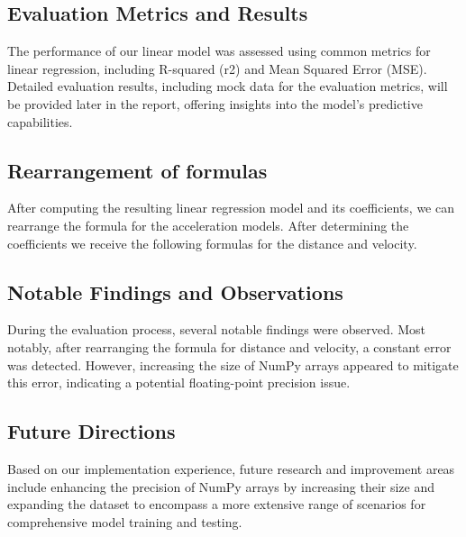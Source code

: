 \subsection{Evaluation Metrics and Results} 
The performance of our linear model was assessed using common metrics for linear regression, including 
R-squared (r2) and Mean Squared Error (MSE). 
Detailed evaluation results, including mock data for the evaluation metrics, will be provided later in the report, 
offering insights into the model's predictive capabilities.

\subsection{Rearrangement of formulas} 
After computing the resulting linear regression model and its coefficients, we can rearrange the formula 
for the acceleration models. 
After determining the coefficients we receive the following formulas for the distance and velocity.


\subsection{Notable Findings and Observations} 
During the evaluation process, several notable findings were observed. 
Most notably, after rearranging the formula for distance and velocity, a constant error was detected. 
However, increasing the size of NumPy arrays appeared to mitigate this error, indicating a potential 
floating-point precision issue.

\subsection{Future Directions} 
Based on our implementation experience, future research and improvement areas include enhancing the 
precision of NumPy arrays by increasing their size and expanding the dataset to encompass a more extensive
range of scenarios for comprehensive model training and testing.

